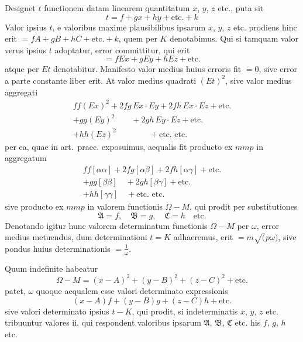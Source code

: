 \documentclass[12pt,a4paper]{book}
\begin{document}
Designet $t$ functionem datam linearem quantitatum $x$, $y$, $z$ etc., puta sit
%
\begin{equation*}
t=f+gx+hy+\text{etc.}+k
\end{equation*}
Valor ipsius $t$, e valoribus maxime plausibilibus ipsarum $x$, $y$, $z$ etc. prodiens hinc erit $=fA+gB+hC+\text{etc.}+k$, quem per $K$ denotabimus. Qui si tamquam valor verus ipsius $t$ adoptatur, error committitur, qui erit
%
\begin{equation*}
=fEx+gEy+hEz+\text{etc.}
\end{equation*}
atque per $Et$ denotabitur. Manifesto valor medius huius erroris fit $=0$, sive error a parte constante liber erit. At valor medius quadrati $(Et)^2$, sive valor medius aggregati
%
\begin{multline*}
ff(Ex)^2+2fg\,Ex\cdot Ey+2fh\,Ex\cdot Ez+\text{etc.}\\
+gg(Ey)^2\qquad+2gh\,Ey\cdot Ez+\text{etc.}\\
+hh(Ez)^2\qquad\qquad+\text{etc. etc.}
\end{multline*}
per ea, quae in art.~praec. exposuimus, aequalis fit producto ex $mmp$ in aggregatum
%
\begin{multline*}
ff[\alpha\alpha]+2fg[\alpha\beta]+2fh[\alpha\gamma]+\text{etc.}\\
+gg[\beta\beta]\quad+2gh[\beta\gamma]+\text{etc.}\\
+hh[\gamma\gamma]\quad+\text{etc. etc.}
\end{multline*}
sive producto ex $mmp$ in valorem functionis $\Omega-M$, qui prodit per substitutiones
%
\begin{equation*}
\mathfrak{A}=f,\quad\mathfrak{B}=g,\quad\mathfrak{C}=h\quad\text{etc.}
\end{equation*}
Denotando igitur hunc valorem determinatum functionis $\Omega-M$ per $\omega$, error medius metuendus, dum determinationi $t=K$ adhaeremus, erit $=m\surd(p\omega)$, sive pondus huius determinationis $=\tfrac{1}{\omega}$.

Quum indefinite habeatur
%
\begin{equation*}
\Omega-M=(x-A)^2+(y-B)^2+(z-C)^2+\text{etc.}
\end{equation*}
patet, $\omega$ quoque aequalem esse valori determinato expressionis
%
\begin{equation*}
(x-A)f+(y-B)g+(z-C)h+\text{etc.}
\end{equation*}
sive valori determinato ipsius $t-K$, qui prodit, si indeterminatis $x$, $y$, $z$ etc. tribuuntur valores ii, qui respondent valoribus ipsarum $\mathfrak{A}$, $\mathfrak{B}$, $\mathfrak{C}$ etc. his $f$, $g$, $h$ etc.
\end{document}
